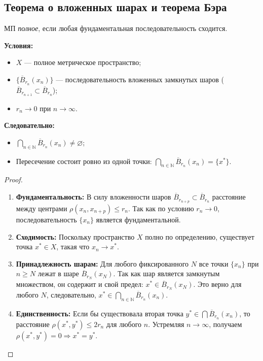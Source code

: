 \subsection{Теорема о вложенных шарах и теорема Бэра}
\begin{definition}
	МП \textit{полное}, если любая фундаментальная последовательность сходится.
\end{definition}

\begin{theorem}\label{kantor-compact}
	\textbf{Условия:}
	\begin{itemize}
		\item $X$ --- полное метрическое пространство;
		\item $\{\overline{B}_{r_n}(x_n)\}$ --- последовательность вложенных замкнутых шаров ($\overline{B}_{r_{n+1}} \subset \overline{B}_{r_n}$);
		\item $r_n \to 0$ при $n \to \infty$.
	\end{itemize}
	\textbf{Следовательно:}
	\begin{itemize}
		\item $\bigcap\limits_{n \in \mathbb{N}} \overline{B}_{r_n}(x_n) \neq \varnothing$;
		\item Пересечение состоит ровно из одной точки: $\bigcap\limits_{n \in \mathbb{N}} \overline B_{r_n}(x_n) = \{x^*\}$.
	\end{itemize}
\end{theorem}

\begin{proof}
	\begin{enumerate}
		\item \textbf{Фундаментальность:} В силу вложенности шаров $\overline{B}_{r_{n+p}} \subset \overline{B}_{r_n}$ расстояние между центрами $\rho(x_n, x_{n+p}) \leqslant r_n$. Так как по условию $r_n \to 0$, последовательность $\{x_n\}$ является фундаментальной.
		\item \textbf{Сходимость:} Поскольку пространство $X$ полно по определению, существует точка $x^* \in X$, такая что $x_n \to x^*$.
		\item \textbf{Принадлежность шарам:} Для любого фиксированного $N$ все точки $\{x_n\}$ при $n \geqslant N$ лежат в шаре $\overline B_{r_N}(x_N)$. Так как шар является замкнутым множеством, он содержит и свой предел: $x^* \in \overline B_{r_N}(x_N)$. Это верно для любого $N$, следовательно, $x^* \in \bigcap_{n \in \mathbb{N}} \overline B_{r_n}(x_n)$.
		\item \textbf{Единственность:} Если бы существовала вторая точка $y^* \in \bigcap \overline B_{r_n}(x_n)$, то расстояние $\rho(x^*, y^*) \leqslant 2r_n$ для любого $n$. Устремляя $n \to \infty$, получаем $\rho(x^*, y^*) = 0 \Rightarrow x^* = y^*$.
	\end{enumerate}
\end{proof}

